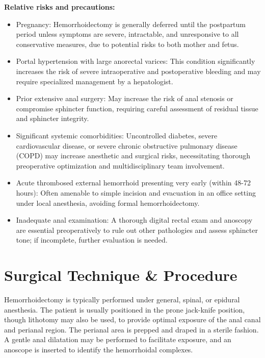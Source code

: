 \textbf{Relative risks and precautions:}

\begin{itemize}
  \item Pregnancy: Hemorrhoidectomy is generally deferred until the postpartum period unless symptoms are severe, intractable, and unresponsive to all conservative measures, due to potential risks to both mother and fetus.
  
  \item Portal hypertension with large anorectal varices: This condition significantly increases the risk of severe intraoperative and postoperative bleeding and may require specialized management by a hepatologist.
  
  \item Prior extensive anal surgery: May increase the risk of anal stenosis or compromise sphincter function, requiring careful assessment of residual tissue and sphincter integrity.
  
  \item Significant systemic comorbidities: Uncontrolled diabetes, severe cardiovascular disease, or severe chronic obstructive pulmonary disease (COPD) may increase anesthetic and surgical risks, necessitating thorough preoperative optimization and multidisciplinary team involvement.
  
  \item Acute thrombosed external hemorrhoid presenting very early (within 48-72 hours): Often amenable to simple incision and evacuation in an office setting under local anesthesia, avoiding formal hemorrhoidectomy.
  
  \item Inadequate anal examination: A thorough digital rectal exam and anoscopy are essential preoperatively to rule out other pathologies and assess sphincter tone; if incomplete, further evaluation is needed.
\end{itemize}

\section*{Surgical Technique \& Procedure}
Hemorrhoidectomy is typically performed under general, spinal, or epidural anesthesia. The patient is usually positioned in the prone jack-knife position, though lithotomy may also be used, to provide optimal exposure of the anal canal and perianal region. The perianal area is prepped and draped in a sterile fashion. A gentle anal dilatation may be performed to facilitate exposure, and an anoscope is inserted to identify the hemorrhoidal complexes.

